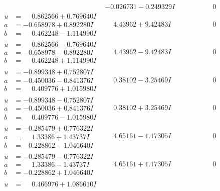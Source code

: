 \documentclass[1p]{elsarticle_modified}
\theoremstyle{definition}
\begin{document}
$$\begin{array}{c|c|c}
 & -0.026731 - 0.249329 I & \phantom{-0.000000 } 0 \\ \hline\begin{aligned}
u &= \phantom{-}0.862566 + 0.769640 I \\
a &= -0.658978 + 0.892280 I \\
b &= \phantom{-}0.462248 - 1.114990 I\end{aligned}
 & \phantom{-}4.43962 + 9.42483 I & \phantom{-0.000000 } 0 \\ \hline\begin{aligned}
u &= \phantom{-}0.862566 - 0.769640 I \\
a &= -0.658978 - 0.892280 I \\
b &= \phantom{-}0.462248 + 1.114990 I\end{aligned}
 & \phantom{-}4.43962 - 9.42483 I & \phantom{-0.000000 } 0 \\ \hline\begin{aligned}
u &= -0.899348 + 0.752807 I \\
a &= -0.450036 - 0.841376 I \\
b &= \phantom{-}0.409776 + 1.015980 I\end{aligned}
 & \phantom{-}0.38102 - 3.25469 I & \phantom{-0.000000 } 0 \\ \hline\begin{aligned}
u &= -0.899348 - 0.752807 I \\
a &= -0.450036 + 0.841376 I \\
b &= \phantom{-}0.409776 - 1.015980 I\end{aligned}
 & \phantom{-}0.38102 + 3.25469 I & \phantom{-0.000000 } 0 \\ \hline\begin{aligned}
u &= -0.285479 + 0.776322 I \\
a &= \phantom{-}1.33386 + 1.43737 I \\
b &= -0.228862 - 1.046640 I\end{aligned}
 & \phantom{-}4.65161 - 1.17305 I & \phantom{-0.000000 } 0 \\ \hline\begin{aligned}
u &= -0.285479 - 0.776322 I \\
a &= \phantom{-}1.33386 - 1.43737 I \\
b &= -0.228862 + 1.046640 I\end{aligned}
 & \phantom{-}4.65161 + 1.17305 I & \phantom{-0.000000 } 0 \\ \hline\begin{aligned}
u &= \phantom{-}0.466976 + 1.086610 I \\

\end{aligned}
\end{array}$$
\end{document}

